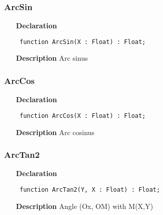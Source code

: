 \documentclass[12pt,a4paper,oneside]{report}
\newcommand{\declarationitem}[1]{\textbf{#1}}
\newcommand{\descriptiontitle}[1]{\textbf{#1}}
\newcommand{\code}[1]{\texttt{#1}}
\begin{document}
\subsubsection{ArcSin}
\label{utrigo-ArcSin}
\begin{itemize}\item[\declarationitem{Declaration}\hfill]
	\begin{flushleft}
		\code{
			function ArcSin(X : Float) : Float;}
		
	\end{flushleft}
	
	\par
	\item[\descriptiontitle{Description}]
	Arc sinus
	
\end{itemize}
\subsubsection{ArcCos}
\label{utrigo-ArcCos}
\begin{itemize}\item[\declarationitem{Declaration}\hfill]
	\begin{flushleft}
		\code{
			function ArcCos(X : Float) : Float;}
		
	\end{flushleft}
	
	\par
	\item[\descriptiontitle{Description}]
	Arc cosinus
	
\end{itemize}
\subsubsection{ArcTan2}
\label{utrigo-ArcTan2}
\begin{itemize}\item[\declarationitem{Declaration}\hfill]
	\begin{flushleft}
		\code{
			function ArcTan2(Y, X : Float) : Float;}
		
	\end{flushleft}
	
	\par
	\item[\descriptiontitle{Description}]
	Angle (Ox, OM) with M(X,Y)
	
\end{itemize}
\end{document}
